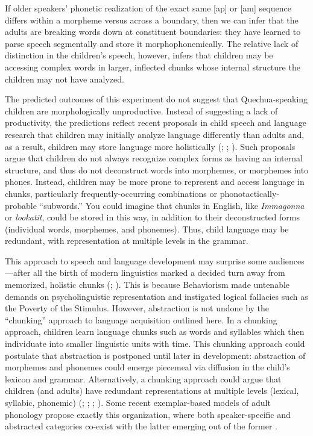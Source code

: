 \documentclass[a4paper,man,floatsintext,natbib,donotrepeattitle, apacite]{apa6}
\begin{document}
If older speakers' phonetic realization of the exact same [ap] or [am] sequence differs within a morpheme versus across a boundary, then we can infer that the adults are breaking words down at constituent boundaries: they have learned to parse speech segmentally and store it morphophonemically. The relative lack of distinction in the children's speech, however, infers that children may be accessing complex words in larger, inflected chunks whose internal structure the children may not have analyzed.

The predicted outcomes of this experiment do not suggest that Quechua-speaking children are morphologically unproductive. Instead of suggesting a lack of productivity, the predictions reflect recent proposals in child speech and language research that children may initially analyze language differently than adults and, as a result, children may store language more holistically (\citealt{davisEmergenceDiscretePerceptualMotor2019}; \citealt{lievenLexicallybasedLearningEarly1997};  \citealt{redfordSpeechProductionDevelopmental2019}). Such proposals argue that children do not always recognize complex forms as having an internal structure, and thus do not deconstruct words into morphemes, or morphemes into phones. Instead, children may be more prone to represent and access language in chunks, particularly frequently-occurring combinations or phonotactically-probable “subwords.” You could imagine that chunks in English, like \textit{Immagonna} or \textit{lookatit}, could be stored in this way, in addition to their deconstructed forms (individual words, morphemes, and phonemes). Thus, child language may be redundant, with representation at multiple levels in the grammar.

This approach to speech and language development may surprise some audiences---after all the birth of modern linguistics marked a decided turn away from memorized, holistic chunks (\citealt{chomskyReviewBFSkinner1959}; \citealt{skinnerVerbalBehavior1957}). This is because Behaviorism made untenable demands on psycholinguistic representation and instigated logical fallacies such as the Poverty of the Stimulus. However, abstraction is not undone by the “chunking” approach to language acquisition outlined here. In a chunking approach, children learn language chunks such as words and syllables which then individuate into smaller linguistic units with time. This chunking approach could postulate that abstraction is postponed until later in development: abstraction of morphemes and phonemes could emerge piecemeal via diffusion in the child's lexicon and grammar. Alternatively, a chunking approach could argue that children (and adults) have redundant representations at multiple levels (lexical, syllabic, phonemic) (\citealt{arnonRoleMultiwordBuilding2017}; \citealt{arnonMoreWordsEffect2013}; \citealt{arnonStartingBigRole2010}; \citealt{bannardStoredWordSequences2008}). Some recent exemplar-based models of adult phonology propose exactly this organization, where both speaker-specific and abstracted categories co-exist with the latter emerging out of the former \citep{pierrehumbertPhonologicalRepresentationAbstract2016}. 
\end{document}
